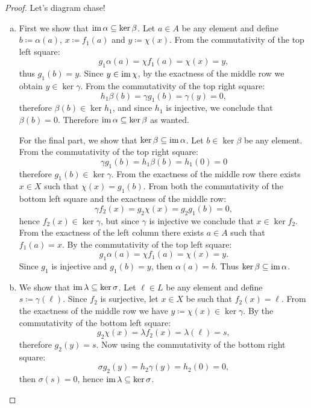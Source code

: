 \begin{proof}
    Let's diagram chase!
    \begin{enumerate}[(a)]\setlength\itemsep{0em}
        \item First we show that \(\operatorname{im} \alpha \subseteq \ker \beta\). Let \(a \in A\) be
              any element and define \(b \coloneq \alpha(a)\), \(x \coloneq f_1(a)\) and \(y
              \coloneq \chi(x)\). From the commutativity of the top left square:
              \[
                  g_1\alpha(a) = \chi f_1(a) = \chi(x) = y,
              \]
              thus \(g_1(b) = y\). Since \(y \in \operatorname{im} \chi\), by the exactness of the middle
              row we obtain \(y \in \ker \gamma\). From the commutativity of the top right
              square:
              \[
                  h_1 \beta(b) = \gamma g_1(b) = \gamma(y) = 0,
              \]
              therefore \(\beta(b) \in \ker h_1\), and since \(h_1\) is injective, we
              conclude that \(\beta(b) = 0\). Therefore \(\operatorname{im} \alpha \subseteq \ker \beta\)
              as wanted.

              For the final part, we show that \(\ker \beta \subseteq \operatorname{im} \alpha\). Let
              \(b \in \ker \beta\) be any element. From the commutativity of the top right
              square:
              \[
                  \gamma g_1(b) = h_1 \beta(b) = h_1(0) = 0
              \]
              therefore \(g_1(b) \in \ker \gamma\). From the exactness of the middle row
              there exists \(x \in X\) such that \(\chi(x) = g_1(b)\). From both the
              commutativity of the bottom left square and the exactness of the middle row:
              \[
                  \gamma f_2(x) = g_2 \chi(x) = g_2 g_1(b) = 0,
              \]
              hence \(f_2(x) \in \ker \gamma\), but since \(\gamma\) is injective we
              conclude that \(x \in \ker f_2\). From the exactness of the left column there
              exists \(a \in A\) such that \(f_1(a) = x\). By the commutativity of the top
              left square:
              \[
                  g_1 \alpha(a) = \chi f_1(a) = \chi(x) = y.
              \]
              Since \(g_1\) is injective and \(g_1(b) = y\), then \(\alpha(a) = b\). Thus
              \(\ker \beta \subseteq \operatorname{im} \alpha\).

        \item We show that \(\operatorname{im} \lambda \subseteq \ker \sigma\). Let \(\ell \in L\) be
              any element and define \(s \coloneq \gamma(\ell)\). Since \(f_2\) is
              surjective, let \(x \in X\) be such that \(f_2(x) = \ell\). From the exactness
              of the middle row we have \(y \coloneq \chi(x) \in \ker \gamma\). By the
              commutativity of the bottom left square:
              \[
                  g_2\chi(x) = \lambda f_2(x) = \lambda(\ell) = s,
              \]
              therefore \(g_2(y) = s\). Now using the commutativity of the bottom right
              square:
              \[
                  \sigma g_2(y) = h_2 \gamma(y) = h_2(0) = 0,
              \]
              then \(\sigma(s) = 0\), hence \(\operatorname{im} \lambda \subseteq \ker \sigma\).


\end{enumerate}
\end{proof}
